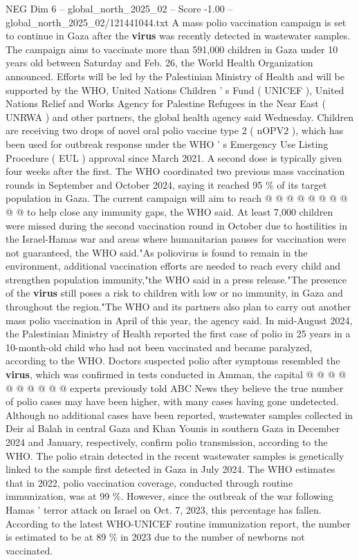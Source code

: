 \begin{textsample}{NEG Dim 6 – global\_north\_2025\_02 – Score -1.00 – global\_north\_2025\_02/121441044.txt}  \label{ex:f6_neg_115}
A mass polio vaccination campaign is set to continue in Gaza after the \textbf{virus} was recently detected in wastewater samples.
The campaign aims to vaccinate more than 591,000 children in Gaza under 10 years old between Saturday and Feb. 26, the World Health Organization announced.
Efforts will be led by the Palestinian Ministry of Health and will be supported by the WHO, United Nations Children ' s Fund ( UNICEF ), United Nations Relief and Works Agency for Palestine Refugees in the Near East ( UNRWA ) and other partners, the global health agency said Wednesday.
Children are receiving two drops of novel oral polio vaccine type 2 ( nOPV2 ), which has been used for outbreak response under the WHO ' s Emergency Use Listing Procedure ( EUL ) approval since March 2021.
A second dose is typically given four weeks after the first.
The WHO coordinated two previous mass vaccination rounds in September and October 2024, saying it reached 95 \% of its target population in Gaza.
The current campaign will aim to reach @ @ @ @ @ @ @ @ @ @ to help close any immunity gaps, the WHO said.
At least 7,000 children were missed during the second vaccination round in October due to hostilities in the Israel-Hamas war and areas where humanitarian pauses for vaccination were not guaranteed, the WHO said."As poliovirus is found to remain in the environment, additional vaccination efforts are needed to reach every child and strengthen population immunity,"the WHO said in a press release."The presence of the \textbf{virus} still poses a risk to children with low or no immunity, in Gaza and throughout the region."The WHO and its partners also plan to carry out another mass polio vaccination in April of this year, the agency said.
In mid-August 2024, the Palestinian Ministry of Health reported the first case of polio in 25 years in a 10-month-old child who had not been vaccinated and became paralyzed, according to the WHO.
Doctors suspected polio after symptoms resembled the \textbf{virus}, which was confirmed in tests conducted in Amman, the capital @ @ @ @ @ @ @ @ @ @ experts previously told ABC News they believe the true number of polio cases may have been higher, with many cases having gone undetected.
Although no additional cases have been reported, wastewater samples collected in Deir al Balah in central Gaza and Khan Younis in southern Gaza in December 2024 and January, respectively, confirm polio transmission, according to the WHO.
The polio strain detected in the recent wastewater samples is genetically linked to the sample first detected in Gaza in July 2024.
The WHO estimates that in 2022, polio vaccination coverage, conducted through routine immunization, was at 99 \%.
However, since the outbreak of the war following Hamas ' terror attack on Israel on Oct. 7, 2023, this percentage has fallen.
According to the latest WHO-UNICEF routine immunization report, the number is estimated to be at 89 \% in 2023 due to the number of newborns not vaccinated.

\end{textsample}
